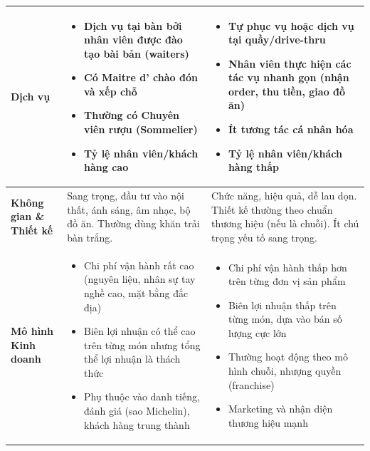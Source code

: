 \begin{longtable}{| m{3.5cm} | >{\RaggedRight}m{6.5cm} | >{\RaggedRight}m{6.5cm} |}
\textbf{Dịch vụ} & \begin{itemize} \item Dịch vụ tại bàn bởi nhân viên được đào tạo bài bản (waiters) \item Có Maitre d' chào đón và xếp chỗ \item Thường có Chuyên viên rượu (Sommelier) \item Tỷ lệ nhân viên/khách hàng cao \end{itemize} & \begin{itemize} \item Tự phục vụ hoặc dịch vụ tại quầy/drive-thru \item Nhân viên thực hiện các tác vụ nhanh gọn (nhận order, thu tiền, giao đồ ăn) \item Ít tương tác cá nhân hóa \item Tỷ lệ nhân viên/khách hàng thấp \end{itemize} \\
\hline
\textbf{Không gian \& Thiết kế} & Sang trọng, đầu tư vào nội thất, ánh sáng, âm nhạc, bộ đồ ăn. Thường dùng khăn trải bàn trắng. & Chức năng, hiệu quả, dễ lau dọn. Thiết kế thường theo chuẩn thương hiệu (nếu là chuỗi). Ít chú trọng yếu tố sang trọng. \\
\hline
\textbf{Mô hình Kinh doanh} & \begin{itemize} \item Chi phí vận hành rất cao (nguyên liệu, nhân sự tay nghề cao, mặt bằng đắc địa) \item Biên lợi nhuận có thể cao trên từng món nhưng tổng thể lợi nhuận là thách thức \item Phụ thuộc vào danh tiếng, đánh giá (sao Michelin), khách hàng trung thành \end{itemize} & \begin{itemize} \item Chi phí vận hành thấp hơn trên từng đơn vị sản phẩm \item Biên lợi nhuận thấp trên từng món, dựa vào bán số lượng cực lớn \item Thường hoạt động theo mô hình chuỗi, nhượng quyền (franchise) \item Marketing và nhận diện thương hiệu mạnh \end{itemize} \\
\hline

\end{longtable}
